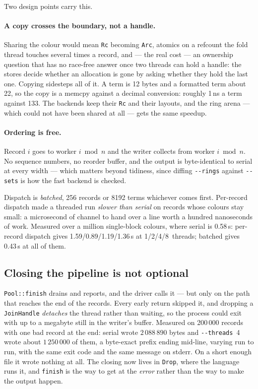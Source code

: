 \documentclass[11pt,a4paper]{article}
\newcommand{\flag}[1]{\texttt{-{}-#1}}
\begin{document}
Two design points carry this.

\paragraph{A copy crosses the boundary, not a handle.} Sharing the colour would
mean \texttt{Rc} becoming \texttt{Arc}, atomics on a refcount the fold thread
touches several times a record, and --- the real cost --- an ownership question
that has no race-free answer once two threads can hold a handle: the stores
decide whether an allocation is gone by asking whether they hold the last one.
Copying sidesteps all of it. A term is 12 bytes and a formatted term about 22,
so the copy is a memcpy against a decimal conversion: roughly 1\,ns a term
against 133. The backends keep their \texttt{Rc} and their layouts, and the ring
arena --- which could not have been shared at all --- gets the same speedup.

\paragraph{Ordering is free.} Record $i$ goes to worker $i \bmod n$ and the
writer collects from worker $i \bmod n$. No sequence numbers, no reorder buffer,
and the output is byte-identical to serial at every width --- which matters
beyond tidiness, since diffing \flag{rings} against \flag{sets} is how the fast
backend is checked.

Dispatch is \emph{batched}, 256 records or 8192 terms whichever comes first.
Per-record dispatch made a threaded run \emph{slower than serial} on records
whose colours stay small: a microsecond of channel to hand over a line worth a
hundred nanoseconds of work. Measured over a million single-block colours, where
serial is 0.58\,s: per-record dispatch gives 1.59/0.89/1.19/1.36\,s at
1/2/4/8~threads; batched gives 0.43\,s at all of them.

\subsection{Closing the pipeline is not optional}

\texttt{Pool::finish} drains and reports, and the driver calls it --- but only on
the path that reaches the end of the records. Every early return skipped it, and
dropping a \texttt{JoinHandle} \emph{detaches} the thread rather than waiting, so
the process could exit with up to a megabyte still in the writer's buffer.
Measured on 200\,000 records with one bad record at the end: serial wrote
$2\,088\,890$ bytes and \flag{threads}~4 wrote about $1\,250\,000$ of them, a
byte-exact prefix ending mid-line, varying run to run, with the same exit code
and the same message on stderr. On a short enough file it wrote nothing at all.
The closing now lives in \texttt{Drop}, where the language runs it, and
\texttt{finish} is the way to get at the \emph{error} rather than the way to make
the output happen.
\end{document}
